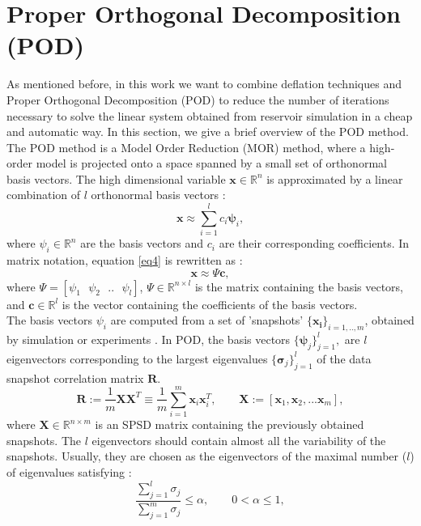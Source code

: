 \documentclass[review]{elsarticle}
\begin{document}
\section{Proper Orthogonal Decomposition (POD)}\label{POD}
As mentioned before, in this work we want to combine deflation techniques and Proper Orthogonal Decomposition (POD) to reduce the number of iterations necessary to solve the linear system obtained from reservoir simulation in a cheap and automatic way. In this section, we give a brief overview of the POD method.\\
The POD method is a Model Order Reduction (MOR) method, where a high-order model is projected onto a space
spanned by a small set of orthonormal basis vectors.
The high dimensional variable $\mathbf{x} \in \mathbb{R}^n$
is approximated by a linear combination of $l$ orthonormal basis vectors \cite{Astrid11}:
\begin{equation}\label{eq4}
  \mathbf{x}\approx \sum_{i=1}^lc_i \mathbf{\psi}_i,
\end{equation}
where $\psi_i \in \mathbb{R}^n$ are the basis vectors and $c_i$ are their corresponding coefficients.
In matrix notation, equation \eqref{eq4} is rewritten as :
$$\mathbf{x}\approx \Psi\mathbf{c},$$
where $\Psi=[\psi_1 \text{ }\psi_2 \text{ }.. \text{ }\psi_l]$, $\Psi \in \mathbb{R}^{n\times l}$ 
is the matrix containing the basis vectors, and $\mathbf{c} \in \mathbb{R}^l$ is the vector 
containing the coefficients of the basis vectors. \\
The basis vectors $\psi_i$ are computed from a set of 'snapshots' $\{ \mathbf{x_i}\} _{i=1,..,m}$, 
obtained by simulation or experiments \cite{Mark06}. 
In POD, the basis vectors $\{ \mathbf{\psi} _j \} ^l _{j=1},$ are $l$ eigenvectors corresponding to 
the largest eigenvalues $\{ \mathbf{\sigma} _j \} ^l _{j=1}$ of the data snapshot correlation matrix $\mathbf{R}$.
\begin{equation}\label{eq:POD}
\mathbf{R}:= \frac{1}{m}\mathbf{X}\mathbf{X}^T \equiv \frac{1}{m} \sum_{i=1}^m \mathbf{x}_i \mathbf{x}_i^T,
\qquad \mathbf{X}:=[\mathbf{x}_1,\mathbf{x}_2,...\mathbf{x}_m],
\end{equation}
where $\mathbf{X}\in \mathbb{R}^{n\times m}$ is an SPSD matrix containing the previously obtained snapshots.
The $l$ eigenvectors should contain almost all the variability of the snapshots. 
Usually, they are chosen as the eigenvectors of the maximal number ($l$) of eigenvalues satisfying \cite{Mark06}:
\begin{equation}
\frac{\sum_{j=1}^l\sigma_j}{\sum_{j=1}^m\sigma_j}\leq \alpha, \qquad 0<\alpha \leq 1,
\end{equation}
\end{document}
